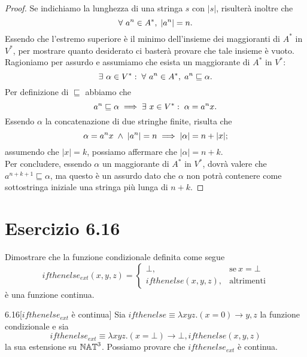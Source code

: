 \begin{proof}
Se indichiamo la lunghezza di una stringa $s$ con $|s|$, risulterà inoltre che 
\[
	\forall \ a^n \in A^* ,\; |a^n| = n.
\]
Essendo che l'estremo superiore è il minimo dell'insieme dei maggioranti di $A^*$ in $V^*$, per mostrare quanto desiderato ci basterà provare che tale insieme è vuoto. Ragioniamo per assurdo e assumiamo che esista un maggiorante di $A^*$ in $V^*$: \[
	\exists \ \alpha \in V^* :\; \forall \ a^n \in A^* ,\; a^n \sqsubseteq \alpha.
\] 
Per definizione di $\sqsubseteq$ abbiamo che \[
	a^n \sqsubseteq \alpha \implies \exists \ x \in V^* :\; \alpha = a^nx.
\]
Essendo $\alpha$ la concatenazione di due stringhe finite, risulta che \[
	\alpha = a^nx \; \land \; |a^n| = n \implies |\alpha| = n + |x|;
\]
assumendo che $|x|=k$, possiamo affermare che $|\alpha|= n+k$.\\ 
Per concludere, essendo $\alpha$ un maggiorante di $A^*$ in $V^*$, dovrà valere che $a^{n+k+1} \sqsubseteq \alpha$, ma questo è un assurdo dato che $\alpha$ non potrà contenere come sottostringa iniziale una stringa più lunga di $n+k$.
\end{proof}

\section*{Esercizio 6.16}
{}
\label{es:6.16}

\begin{tcolorbox} \cite{mssc2016}
Dimostrare che la funzione condizionale definita come segue \[
	ifthenelse_{ext}(x,y,z) = 
	\begin{cases}
		\bot, & \text{se}\ x = \bot \\
		ifthenelse(x,y,z), & \text{altrimenti}
	\end{cases}
\]
è una funzione continua.
\end{tcolorbox}

\begin{customthm}{6.16}[$ifthenelse_{ext}$ è continua]
\label{th:6.16}
Sia $ifthenelse \equiv \lambda xyz. (x = 0) \rightarrow y, z$ la funzione condizionale e sia
\[
	ifthenelse_{ext} \equiv \lambda xyz. (x = \bot) \rightarrow \bot, ifthenelse(x,y,z)
\]
la sua estensione su $\mathbb{NAT}^3$. Possiamo provare che $ifthenelse_{ext}$ è continua.
\end{customthm}

